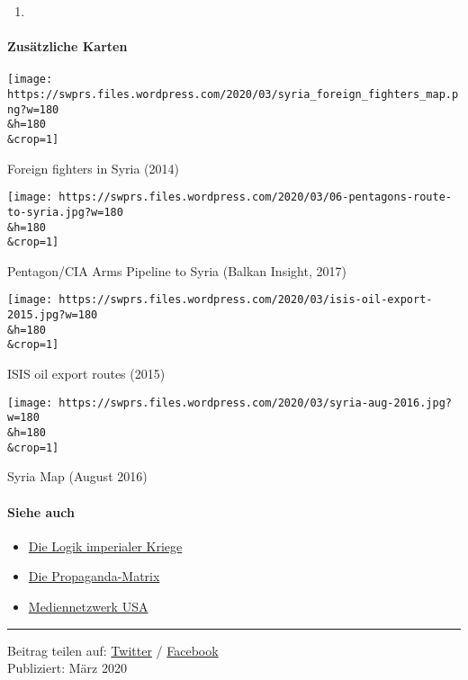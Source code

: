 \begin{enumerate}
\def\labelenumi{\arabic{enumi})}
\setcounter{enumi}{2018}
\item
\end{enumerate}

\hypertarget{zusuxe4tzliche-karten}{%
\paragraph{Zusätzliche Karten}\label{zusuxe4tzliche-karten}}

\texttt{[image: https://swprs.files.wordpress.com/2020/03/syria\_foreign\_fighters\_map.png?w=180\\\&h=180\\\&crop=1]}

Foreign fighters in Syria (2014)

\texttt{[image: https://swprs.files.wordpress.com/2020/03/06-pentagons-route-to-syria.jpg?w=180\\\&h=180\\\&crop=1]}

Pentagon/CIA Arms Pipeline to Syria (Balkan Insight, 2017)

\texttt{[image: https://swprs.files.wordpress.com/2020/03/isis-oil-export-2015.jpg?w=180\\\&h=180\\\&crop=1]}

ISIS oil export routes (2015)

\texttt{[image: https://swprs.files.wordpress.com/2020/03/syria-aug-2016.jpg?w=180\\\&h=180\\\&crop=1]}

Syria Map (August 2016)

\hypertarget{siehe-auch}{%
\paragraph{Siehe auch}\label{siehe-auch}}

\begin{itemize}
\tightlist
\item
  \href{https://swprs.org/logik-imperialer-kriege/}{Die Logik imperialer
  Kriege}
\item
  \href{https://swprs.org/die-propaganda-matrix/}{Die Propaganda-Matrix}
\item
  \href{https://swprs.org/das-american-empire-und-seine-medien/}{Mediennetzwerk
  USA}
\end{itemize}

\begin{center}\rule{0.5\linewidth}{\linethickness}\end{center}

Beitrag teilen auf:
\href{https://twitter.com/intent/tweet?url=https://swprs.org/syrienkrieg-geopolitik-medien/}{Twitter}
/
\href{https://www.facebook.com/share.php?u=https://swprs.org/syrienkrieg-geopolitik-medien/}{Facebook}\\
Publiziert: März 2020

